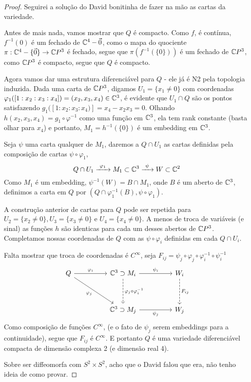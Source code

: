 \begin{exercise}
    \label{prob:l3:2}
\end{exercise}
\begin{proof}
    Seguirei a solução do David bonitinha de fazer na mão as cartas da variedade.
    
    Antes de mais nada, vamos mostrar que $Q$ é compacto. Como $f$, é contínua, $f^{-1}({0})$ é um fechado de $\mathbb{C}^4 - \vec{0}$, como o mapa do quociente
    $\pi : \mathbb{C}^4 - \{\vec{0}\} \rightarrow \mathbb{C} P^3$ é fechado, segue que $\pi(f^{-1}(\{0\}))$ é um fechado de $\mathbb{C} P^3$, como $\mathbb{C} P^3$ é compacto, segue que $Q$ é compacto.

    Agora vamos dar uma estrutura diferenciável para $Q$ - ele já é N2 pela topologia induzida.
    Dada uma carta de $\mathbb{C} P^3$, digamos $U_1 = \{x_1 \neq 0\}$ com coordenadas $\varphi_1([1:x_2:x_3:x_4]) = (x_2,x_3,x_4) \in \mathbb{C}^3$,
    é evidente que $U_1 \cap Q$ são os pontos satisfazendo $g_1([1:x_2:x_3:x_4)] = x_4 - x_2x_3 = 0$. Olhando $h(x_2,x_3,x_4) = g_1\circ\varphi^{-1}$ como uma função 
    em $\mathbb{C}^3$, ela tem rank constante (basta olhar para $x_4$) e portanto, $M_1 = h^{-1}(\{0\})$ é um embedding em $\mathbb{C}^3$.

    Seja $\psi$ uma carta qualquer de $M_1$, daremos a $Q \cap U_1$ as cartas definidas pela composição de cartas $\psi \circ \varphi_1$, 
    \[
    Q \cap U_1 \xrightarrow{\ \varphi_1\ } M_1 \subset \mathbb{C}^3 \xrightarrow{\ \psi\ } W \subset \mathbb{C}^2
    \]
    Como $M_1$ é um embedding, $\psi^{-1}(W) = B \cap M_1$, onde $B$ é um aberto de $\mathbb{C}^3$, definimos a carta em $Q$
    por $(Q \cap \varphi_1^{-1}(B), \psi \circ \varphi_1)$.
    
    A construção anterior de cartas para $Q$ pode ser repetida para $U_2 = \{x_2 \neq 0\}, U_3 = \{x_3 \neq 0\}$ e $U_4 = \{x_4 \neq 0\}$.
    A menos de troca de variáveis (e sinal) as funções $h$ são identicas para cada um desses abertos de $\mathbb{C} P^3$. Completamos nossas 
    coordenadas de $Q$ com as $\psi \circ \varphi_i$ definidas em cada $Q \cap U_i$.

    Falta mostrar que troca de coordenadas é $C^\infty$, seja $F_{ij} = \psi_j \circ \varphi_j \circ \varphi_i^{-1} \circ \psi_i^{-1}$
   \[
        \begin{tikzcd}[column sep=huge, row sep=huge]
        Q \arrow[r, "\varphi_i"] \arrow[dr, "\varphi_j"'] 
        & \C^3 \arrow[d, dashed, "\varphi_j \circ \varphi_i^{-1}"]  \supset M_i \arrow[r, "\psi_i"] 
            & W_i \arrow[d, dashed, "F_{ij}"] \\
        & \C^3 \supset M_j \arrow[r, "\psi_j"'] & W_j
        \end{tikzcd}
    \]
    Como composição de funções $C^\infty$, (e o fato de $\psi_j$ serem embeddings para a continuidade), segue que $F_{ij}$ é $C^\infty$.
    E portanto $Q$ é uma variedade diferenciável compacta de dimensão complexa 2 (e dimensão real 4).

    Sobre ser diffeomorfa com $S^2 \times S^2$, acho que o David falou que era, não tenho ideia de como provar.



\end{proof}

